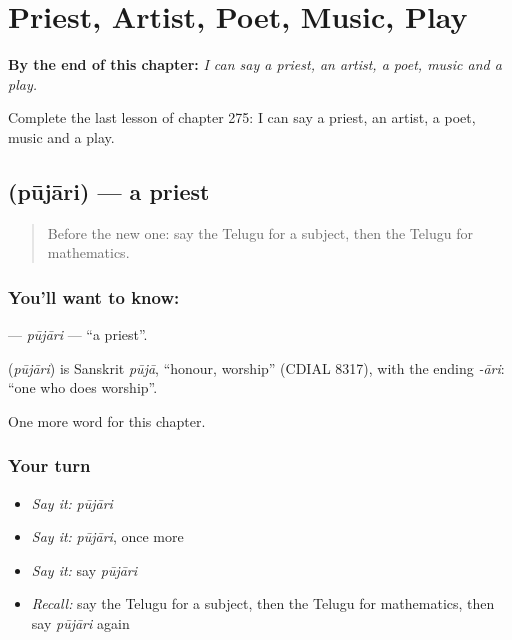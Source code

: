 
\chapter{Priest, Artist, Poet, Music, Play}
\label{ch:te-priest-artist-poet-music-play}

\begin{chapteropening}
\textbf{By the end of this chapter:} \emph{I can say a priest, an artist, a poet, music and a play.}

Complete the last lesson of chapter 275: I can say a priest, an artist, a poet, music and a play.
\end{chapteropening}

\section[\texorpdfstring{\te{పూజారి} (pūjāri)}{పూజారి (pūjāri)}]{ (pūjāri) — a priest}

\label{lesson:TE-C275-pujari}



\begin{quote}
Before the new one: say the Telugu for a subject, then the Telugu for mathematics.
\end{quote}

\subsection*{You'll want to know: }
\textbf{} — \emph{pūjāri} — \textquotedblleft{}a priest\textquotedblright{}.

\begin{cousinweb}
\textbf{} (\emph{pūjāri}) is Sanskrit \emph{pūjā}, \textquotedblleft{}honour, worship\textquotedblright{} (CDIAL 8317), with the ending \emph{-āri}: \textquotedblleft{}one who does worship\textquotedblright{}.
\end{cousinweb}

\begin{grammarlens}[title={What you've built}]
One more word for this chapter.
\end{grammarlens}

\subsection*{Your turn}
\begin{itemize}
\raggedright
  \item \emph{Say it:} \emph{pūjāri}
  \item \emph{Say it:} \emph{pūjāri}, once more
  \item \emph{Say it:} say \emph{pūjāri}
  \item \emph{Recall:} say the Telugu for a subject, then the Telugu for mathematics, then say \emph{pūjāri} again
\end{itemize}

